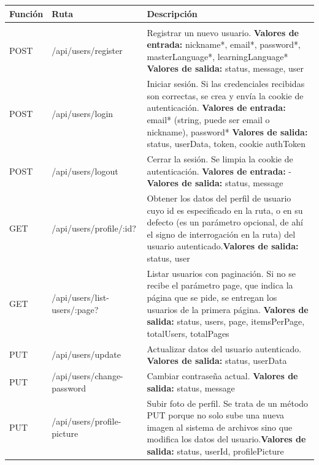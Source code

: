 \begin{longtable}{|l|p{5cm}|p{8cm}|}
\hline
\textbf{Función} & \textbf{Ruta} & \textbf{Descripción} \\
\hline
\endhead
\hline
\endfoot
\multicolumn{3}{|c|}{\textbf{User}} \\
\hline
POST & /api/users/register & Registrar un nuevo usuario. \newline \textbf{Valores de entrada:} nickname*, email*, password*, master\-Language*, learning\-Language* \newline \textbf{Valores de salida:} status, message, user \\
POST & /api/users/login & Iniciar sesión. Si las credenciales recibidas son correctas, se crea y envía la cookie de autenticación. \newline \textbf{Valores de entrada:} email* (string, puede ser email o nickname), password* \newline \textbf{Valores de salida:} status, userData, token, cookie authToken \\
POST & /api/users/logout & Cerrar la sesión. Se limpia la cookie de autenticación. \newline \textbf{Valores de entrada:} - \newline \textbf{Valores de salida:} status, message \\
GET & /api/users/profile/:id? & Obtener los datos del perfil de usuario cuyo id es especificado en la ruta, o en su defecto (es un parámetro opcional, de ahí el signo de interrogación en la ruta) del usuario autenticado.\newline \textbf{Valores de salida:} status, user \\
GET & /api/users/list-users/:page? & Listar usuarios con paginación. Si no se recibe el parámetro page, que indica la página que se pide, se entregan los usuarios de la primera página. \newline \textbf{Valores de salida:} status, users, page, itemsPerPage, totalUsers, totalPages \\
PUT & /api/users/update & Actualizar datos del usuario autenticado. \newline \textbf{Valores de salida:} status, userData \\
PUT & /api/users/change-password & Cambiar contraseña actual. \newline \textbf{Valores de salida:} status, message \\
PUT & /api/users/profile-picture & Subir foto de perfil. Se trata de un método PUT porque no solo sube una nueva imagen al sistema de archivos sino que modifica los datos del usuario.\newline \textbf{Valores de salida:} status, userId, profilePicture \\

\end{longtable}
